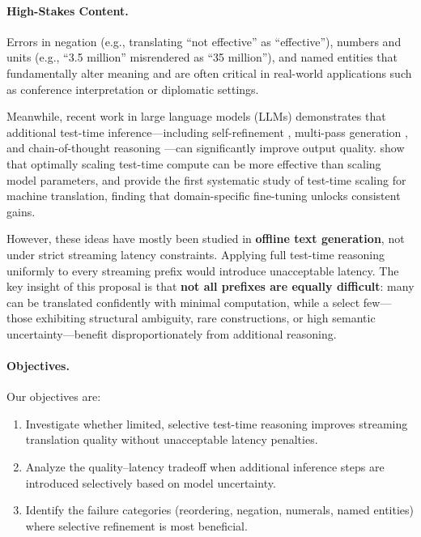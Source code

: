 \paragraph{High-Stakes Content.} Errors in negation (e.g., translating ``not effective'' as ``effective''), numbers and units (e.g., ``3.5 million'' misrendered as ``35 million''), and named entities that fundamentally alter meaning and are often critical in real-world applications such as conference interpretation or diplomatic settings.

Meanwhile, recent work in large language models (LLMs) demonstrates that additional test-time inference---including self-refinement \citep{madaan2023selfrefine}, multi-pass generation \citep{wang2023selfconsistency}, and chain-of-thought reasoning \citep{wei2022cot}---can significantly improve output quality. \citet{snell2024scaling} show that optimally scaling test-time compute can be more effective than scaling model parameters, and \citet{li2025tts_mt} provide the first systematic study of test-time scaling for machine translation, finding that domain-specific fine-tuning unlocks consistent gains.

However, these ideas have mostly been studied in \textbf{offline text generation}, not under strict streaming latency constraints. Applying full test-time reasoning uniformly to every streaming prefix would introduce unacceptable latency. The key insight of this proposal is that \textbf{not all prefixes are equally difficult}: many can be translated confidently with minimal computation, while a select few---those exhibiting structural ambiguity, rare constructions, or high semantic uncertainty---benefit disproportionately from additional reasoning.

\paragraph{Objectives.} Our objectives are:
\begin{enumerate}[leftmargin=*, itemsep=2pt]
    \item Investigate whether limited, selective test-time reasoning improves streaming translation quality without unacceptable latency penalties.
    \item Analyze the quality--latency tradeoff when additional inference steps are introduced selectively based on model uncertainty.
    \item Identify the failure categories (reordering, negation, numerals, named entities) where selective refinement is most beneficial.
\end{enumerate}


